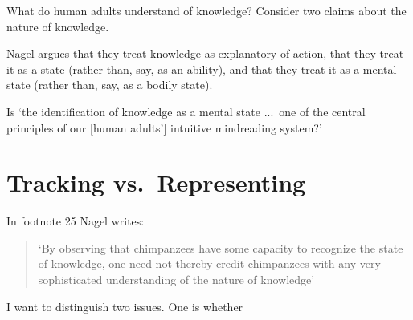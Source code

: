 \documentclass[11pt,a4paper]{extarticle}
\begin{document}
What do human adults understand of knowledge?
Consider two claims about the nature of knowledge.



Nagel argues that they treat knowledge as explanatory of action, that they treat it as a state (rather than, say, as an ability), and that they treat it as a mental state (rather than, say, as a bodily state).
 

Is `the identification of knowledge as a mental state ...\ one of the central principles of our [human adults'] intuitive mindreading system?'




\section{Tracking vs.\ Representing}




In footnote 25 Nagel writes:
%
\begin{quote}
`By observing that chimpanzees have some capacity to recognize the state of knowledge, one need not thereby credit chimpanzees with any very sophisticated understanding of the nature of knowledge'
\end{quote}
%
I want to distinguish two issues.
One is whether 





\end{document}
